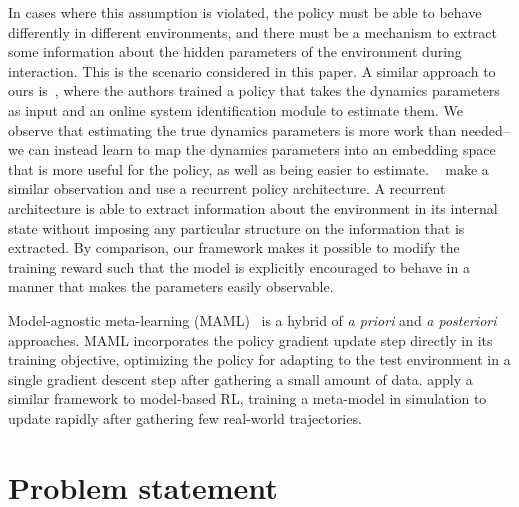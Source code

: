 \documentclass{article}
\begin{document}
In cases where this assumption is violated, the policy must be able to behave differently in different environments,
and there must be a mechanism to extract some information about the hidden parameters of the environment during interaction.
This is the scenario considered in this paper.
A similar approach to ours is~\citet{yu-up-osi-rss17},
where the authors trained a policy that takes the dynamics parameters as input
and an online system identification module to estimate them.
We observe that estimating the true dynamics parameters is more work than needed--
we can instead learn to map the dynamics parameters into an embedding space
that is more useful for the policy, as well as being easier to estimate.
~\citet{peng-dynamics-randomization-corr17} make a similar observation and use a recurrent policy architecture.
A recurrent architecture is able to extract information about the environment in its internal state without imposing any particular structure on the information that is extracted.
By comparison, our framework makes it possible to modify the training reward such that the model is explicitly encouraged to behave in a manner that makes the parameters easily observable.

Model-agnostic meta-learning (MAML)~\citep{finn-maml-icml17} is a hybrid of \emph{a priori} and \emph{a posteriori} approaches.
MAML incorporates the policy gradient update step directly in its training objective,
optimizing the policy for adapting to the test environment in a single gradient descent step after gathering a small amount of data.
\citet{clavera-maml-model} apply a similar framework to model-based RL, training a meta-model in simulation
to update rapidly after gathering few real-world trajectories.




\section{Problem statement}
\end{document}
